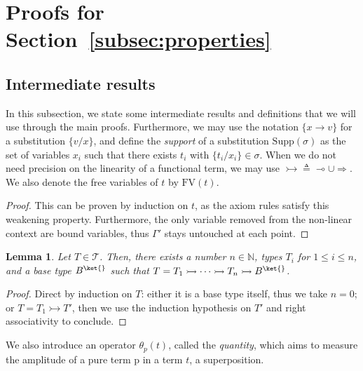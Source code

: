\documentclass[10pt,a4paper]{article}
\newcommand{\tvar}{T}
\newcommand{\bvar}{B}
\newcommand\bkvar{\bvar^{\ket{}}}
\newcommand{\nonlinfunc}{\Rightarrow}
\newcommand{\linfunc}{\multimap}
\newcommand{\anyfunc}{\rightarrowtail}
\newcommand{\fv}[1]{\mathrm{FV}(#1)}
\newcommand{\subsupp}[1]{\mathrm{Supp}(#1)}
\newcommand{\eg}{\text{e.g., }}
\newcommand{\qt}[2]{\theta_{#1}(#2)}
\newtheorem{lemma}[theorem]{Lemma}
\begin{document}
\section{Proofs for Section~\ref{subsec:properties}}

\subsection{Intermediate results}

In this subsection, we state some intermediate results
and definitions that we will use through the main proofs.
Furthermore, we may use the notation $\{x \to v\}$ for a
substitution $\{ v / x \}$, and define the \emph{support} of
a substitution $\subsupp \sigma$ as the set of variables $x_i$
such that there exists $t_i$ with $\{ t_i / x_i \} \in \sigma$.
When we do not need precision on the linearity of a functional term,
we may use $\anyfunc \triangleq \linfunc \cup \nonlinfunc$.
We also denote the free variables of $t$ by $\fv t$.

\weakening*

\begin{proof}
  This can be proven by induction on $t$, as the axiom rules satisfy
  this weakening property.
  Furthermore, the only variable removed from the non-linear context
  are bound variables,
  thus $\Gamma'$ stays untouched at each point. \qedhere
\end{proof}

\begin{lemma}\label{lem:functype}
  Let $\tvar \in \mathcal T$.  Then, there exists a number
  $n \in \mathbb N$, types $T_i$ for $1 \leq i \leq n$,
  and a base type $\bkvar$ such that
  $\tvar = \tvar_1 \anyfunc \dots \anyfunc \tvar_n \anyfunc \bkvar$.
\end{lemma}

\begin{proof}
  Direct by induction on $\tvar$: either it is a base type itself, thus we take
  $n = 0$; or $\tvar = \tvar_1 \anyfunc \tvar'$, then we use the induction
  hypothesis on $\tvar'$ and right associativity to conclude. \qedhere
\end{proof}

We also introduce an operator $\qt p t$, called the \emph{quantity},
which aims to measure the amplitude of a pure term p in a term $t$,
\eg{} a superposition.
\end{document}
